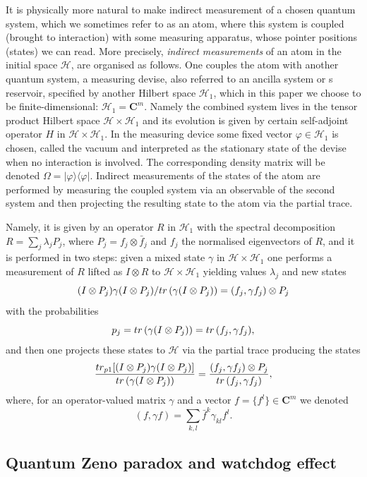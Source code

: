 \documentclass[10pt,a4paper]{amsart}
\def\HC{\mathcal{H}}
\def\C{\mathbf{C}}
\def\tr{\rm{tr}}
\def\ga{\gamma}
\newcommand{\la}{\lambda}
\newcommand{\Om}{\Omega}
\begin{document}
It is physically more natural to make indirect measurement of a chosen quantum system,
which we sometimes refer to as an atom, where this system is coupled (brought to interaction) with
some measuring apparatus, whose pointer positions (states) we can read.  More precisely,
{\it indirect measurements} of an atom in the initial space $\HC$,
are organised as follows.
One couples the atom with another quantum system, a measuring devise,
also referred to an ancilla system or s reservoir, specified
by another Hilbert space $\HC_1$, which in this paper we choose to be finite-dimensional: $\HC_1=\C^m$.
 Namely the combined system lives in the tensor product
 Hilbert space $\HC\times \HC_1$ and its evolution is given by  certain self-adjoint
 operator $H$ in  $\HC\times \HC_1$. In the measuring device some fixed vector $\varphi \in \HC_1$
 is chosen, called the vacuum and interpreted as the stationary state of the devise when
 no interaction is involved. The corresponding density matrix will be denoted $\Om=|\varphi \rangle \langle \varphi|$.
 Indirect measurements of the states of the atom
 are performed by measuring the coupled system via an observable of the second system
 and then projecting the resulting state to the atom via the partial trace.

Namely, it is given by an operator $R$ in $\HC_1$ with the spectral decomposition
$R=\sum_j \la_j P_j$, where $P_j=f_j\otimes \bar f_j$ and $f_j$ the normalised eigenvectors of $R$,
 and it is performed in two steps: given a mixed state $\ga$ in  $\HC\times \HC_1$
one performs a measurement of $R$ lifted as $I\otimes R$ to $\HC\times \HC_1$
yielding values $\la_j$ and new states
\[
(I\otimes P_j)\ga (I\otimes P_j)/ {\tr} \, (\ga  (I\otimes P_j))=(f_j, \ga f_j) \otimes P_j
\]
with the probabilities
\[
p_j= {\tr} \, (\ga  (I\otimes P_j))={\tr} \, (f_j, \ga f_j),
\]
and then one projects these states to $\HC$
via the partial trace producing the states
\begin{equation}
\label{eqindirmeas}
\frac{{\tr}_{p1} [(I\otimes P_j)\ga (I\otimes P_j)]}{ {\tr} \, (\ga  (I\otimes P_j))}
=\frac{(f_j, \ga f_j) \otimes P_j}{{\tr}\, (f_j, \ga f_j)},
\end{equation}
where, for an operator-valued matrix $\ga$ and a vector $f=\{f^l\}\in \C^m$ we denoted
\[
(f,\ga f)=\sum_{k,l} \bar f^k\ga_{kl} f^l.
\]

\subsection{Quantum Zeno paradox and watchdog effect}
\end{document}
